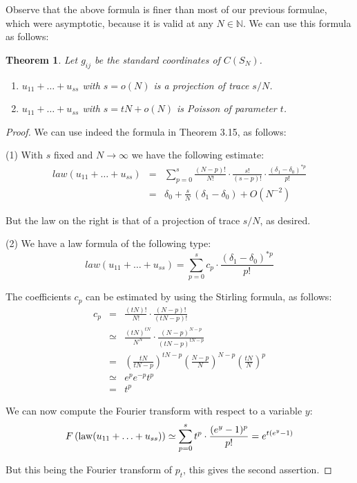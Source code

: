\documentclass[12pt]{amsbook}
\newtheorem{theorem}{Theorem}[chapter]
\begin{document}
Observe that the above formula is finer than most of our previous formulae, which were asymptotic, because it is valid at any $N\in\mathbb N$. We can use this formula as follows:

\begin{theorem}
Let $g_{ij}$ be the standard coordinates of $C(S_N)$.
\begin{enumerate}
\item $u_{11}+\ldots +u_{ss}$ with $s=o(N)$ is a projection of trace $s/N$. 

\item $u_{11}+\ldots +u_{ss}$ with $s=tN+o(N)$ is Poisson of parameter $t$.
\end{enumerate}
\end{theorem}

\begin{proof}
We can use indeed the formula in Theorem 3.15, as follows:

\medskip

(1) With $s$ fixed and $N\to\infty$ we have the following estimate:
\begin{eqnarray*}
law(u_{11}+\ldots +u_{ss})
&=&\sum_{p=0}^s\frac{(N-p)!}{N!}\cdot\frac{s!}{(s-p)!}
\cdot\frac{\left(\delta_1-\delta_0\right)^{*p}}{p!}\\
&=&\delta_0+\frac{s}{N}\,(\delta_1-\delta_0)+O(N^{-2})
\end{eqnarray*}

But the law on the right is that of a projection of trace $s/N$, as desired.

\medskip

(2) We have a law formula of the following type:
$$law(u_{11}+\ldots +u_{ss})=
\sum_{p=0}^sc_p\cdot\frac{(\delta_1-\delta_0)^{*p}}{p!}$$

The coefficients $c_p$ can be estimated by using the Stirling formula, as follows:
\begin{eqnarray*}
c_p
&=&\frac{(tN)!}{N!}\cdot\frac{(N-p)!}{(tN-p)!}\\
&\simeq&\frac{(tN)^{tN}}{N^N}\cdot\frac{(N-p)^{N-p}}{(tN-p)^{tN-p}}\\
&=&\left(\frac{tN}{tN-p}\right)^{tN-p} \left(
\frac{N-p}{N}\right)^{N-p}\left( \frac{tN}{N}\right)^p\\
&\simeq&e^{p}e^{-p}t^p\\
&=&t^p
\end{eqnarray*}

We can now compute the Fourier transform with respect to a variable $y$:
$$F\left( {\rm law}(u_{11}+\ldots +u_{ss})\right)
\simeq\sum_{p=0}^st^p\cdot\frac{(e^y-1)^p}{p!}
=e^{t(e^y-1)}$$

But this being the Fourier transform of $p_t$, this gives the second assertion.
\end{proof}
\end{document}
